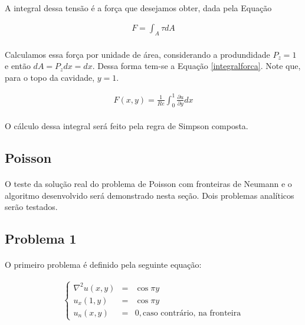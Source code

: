 \documentclass[validacao.tex]{subfiles}
\begin{document}
\paragraph{} A integral dessa tensão é a força que desejamos obter, dada pela Equação

\begin{eqnarray}
F=\int_A {\tau dA}
\end{eqnarray}

\paragraph{} Calculamos essa força por unidade de área, considerando a produndidade $P_z=1$ e então $dA=P_z dx = dx$. Dessa forma tem-se a Equação \ref{integralforca}. Note que, para o topo da cavidade, $y=1$.

\begin{eqnarray}
F(x,y)=\frac{1}{\mathit{Re}}\int_0^1 \frac{\partial u}{\partial y} dx \label{integralforca}
\end{eqnarray}

\paragraph{} O cálculo dessa integral será feito pela regra de Simpson composta.

\subsection{Poisson}
\paragraph{} O teste da solução real do problema de Poisson com fronteiras de Neumann e o algoritmo desenvolvido será demonstrado nesta seção. Dois problemas analíticos serão testados.

\subsection{Problema 1}

\paragraph{} O primeiro problema é definido pela seguinte equação:

\begin{eqnarray}
\left\{\begin{array}{ccl}
\nabla^2u(x,y) & = & \cos\pi y\\
u_x(1,y) & = & \cos\pi y\\
u_n(x,y) & = & 0, \textrm{caso contrário, na fronteira}
\end{array}\right.
\end{eqnarray}
\end{document}
